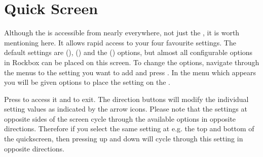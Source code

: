 
{
\section{\label{ref:QuickScreen}Quick Screen}
  Although the  is accessible from nearly everywhere,
  not just the , it is worth mentioning here.  It allows
  rapid access to your four favourite settings.  The default settings are
   (),
   () and the
   () options, but almost all
  configurable options in Rockbox can be placed on this screen.  To change the
  options, navigate through the menus to the setting you want to add and press
  \ActionStdContext.  In the menu which appears you will be given options
  to place the setting on the .
  
  Press \ActionStdQuickScreen{} to access it and \ActionQuickScreenExit{} to exit.
  The direction buttons will modify the individual setting values as indicated 
  by the arrow icons. Please note that the settings at opposite sides of the
   screen cycle through the available options in opposite directions.
   Therefore if you select the same setting at e.g. the top and bottom of the
   quickscreen, then pressing up and down will cycle through this setting in
   opposite directions.
}
